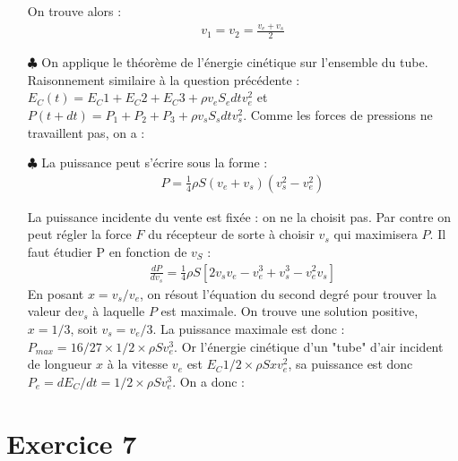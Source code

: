 \documentclass{report}
\begin{document}
\begin{itemize}
	On trouve alors :
	\begin{align*}
		v_1=v_2=\frac{v_e+v_s}{2}
	\end{align*}
	
	\item[$\clubsuit$] On applique le théorème de l'énergie cinétique sur l'ensemble du tube. Raisonnement similaire à la question précédente : $E_C(t)=E_C1+E_C2+E_C3+\rho v_e S_e dtv_e^2$ et $P(t+dt)=P_1+P_2+P_3+\rho v_s S_s dtv_s^2$. Comme les forces de pressions ne travaillent pas, on a :
	
	\noindent{}
	
	\item[$\clubsuit$] La puissance peut s'écrire sous la forme :
	\begin{align*}
		P=\frac{1}{4}\rho S(v_e+v_s)(v_s^2-v_e^2)
	\end{align*}	

	La puissance incidente du vente est fixée : on ne la choisit pas. Par contre on peut régler la force $F$ du récepteur de sorte 	à choisir $v_s$ qui maximisera $P$. Il faut étudier P en fonction de $v_S$ :
	\begin{align*}
		\frac{dP}{dv_s}=\frac{1}{4}\rho S\left[2v_sv_e-v_e^3+v_s^3-v_e^2v_s \right] 
	\end{align*}
	En posant $x=v_s/v_e$, on résout l'équation du second degré pour trouver la valeur de$v_s$ à laquelle $P$ est maximale. On trouve une solution positive, $x=1/3$, soit $v_s=v_e/3$.
	La puissance maximale est donc : $P_{max}=16/27\times1/2\times\rho Sv_e^3 $. Or l'énergie cinétique d'un "tube" d'air incident de longueur $x$ à la vitesse $v_e$ est $E_C1/2\times\rho Sxv_e^2$, sa puissance est donc $P_e=dE_C/dt=1/2\times\rho Sv_e^3$. On a donc :
	
	\noindent{}
	
\end{itemize}

\section*{Exercice 7}
\end{document}
